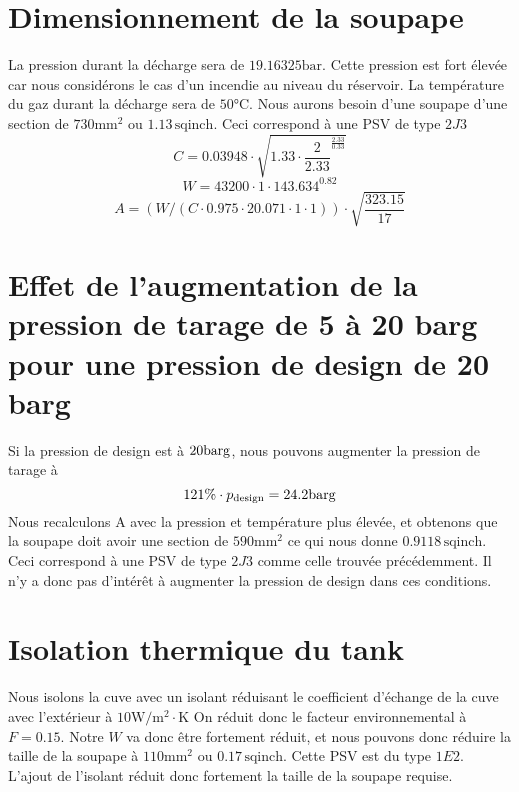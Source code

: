 \section{Dimensionnement de la soupape} 
La pression durant la décharge sera de $19.16325 \si{\bar}$. 
Cette pression est fort élevée car nous considérons le cas d'un incendie au niveau du réservoir. 
La température du gaz durant la décharge sera de $50\si{\celsius}$. 
Nous aurons besoin d'une soupape d'une section de $730\si{\milli\meter\squared}$ 
ou $1.13 \, \text{sqinch}$. Ceci correspond à une PSV de type $2J3$
\[ C = 0.03948 \cdot \sqrt{1.33 \cdot \frac{2}{2.33}^{\frac{2.33}{0.33}}} \]
\[ W = 43200 \cdot 1 \cdot 143.634^{0.82} \]
\[ A = (W / (C \cdot 0.975 \cdot 20.071 \cdot 1 \cdot 1)) \cdot \sqrt{\frac{323.15}{17}} \]

\section{Effet de l'augmentation de la pression de tarage de 5 à 20 barg pour une pression de design de 20 barg} 
Si la pression de design est à $20\si{\bar}\text{g}$, nous pouvons augmenter la pression de tarage à \[ 121\% \cdot p_{\text{design}} = 24.2\si{\bar}\text{g} \]
Nous recalculons A avec la pression et température plus élevée, et obtenons que la soupape doit avoir une section de $590\si{\milli\meter\squared}$
ce qui nous donne $0.9118 \, \text{sqinch}$. Ceci correspond à une PSV de type $2J3$ comme celle trouvée précédemment. Il n'y a donc pas d'intérêt
à augmenter la pression de design dans ces conditions.

\section{Isolation thermique du tank}
Nous isolons la cuve avec un isolant réduisant le coefficient d'échange de la cuve avec l'extérieur à 
$10 \si{\watt}/\si{\meter\squared} \cdot \si{\kelvin}$
On réduit donc le facteur environnemental à $F = 0.15$. 
Notre $W$ va donc être fortement réduit, et nous pouvons donc réduire la taille de la soupape à 
$110\si{\milli\meter\squared}$ ou $0.17 \, \text{sqinch}$. Cette PSV est du type $1E2$. L'ajout de l'isolant réduit donc fortement la taille de
la soupape requise.


